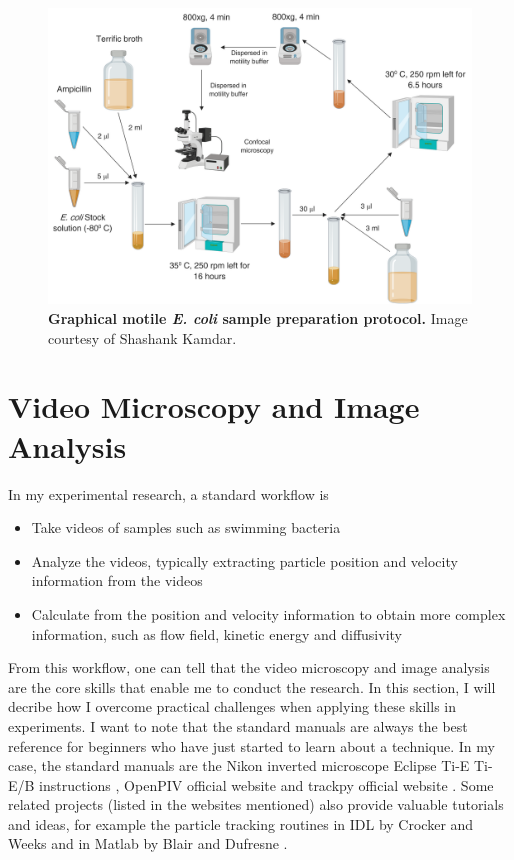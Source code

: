 \begin{figure}[!]
	\begin{center}
	\includegraphics[width=5.5 in]{Figs/2-Exp/2.pdf}
	\end{center}
	\caption[Figure 2.2:]
	{
	\textbf{Graphical motile \textit{E. coli} sample preparation protocol.}
	Image courtesy of Shashank Kamdar.
	}
	\label{fig:2-2}
\end{figure}





\section{Video Microscopy and Image Analysis}
\label{video-microscopy-and-image-analysis}
In my experimental research, a standard workflow is
\begin{itemize}
	\item Take videos of samples such as swimming bacteria
	\item Analyze the videos, typically extracting particle position and velocity information from the videos
	\item Calculate from the position and velocity information to obtain more complex information, such as flow field, kinetic energy and diffusivity
\end{itemize}
From this workflow, one can tell that the video microscopy and image analysis are the core skills that enable me to conduct the research.
In this section, I will decribe how I overcome practical challenges when applying these skills in experiments. I want to note that the standard manuals are always the best reference for beginners who have just started to learn about a technique.
In my case, the standard manuals are the Nikon inverted microscope Eclipse Ti-E Ti-E/B instructions \cite{NikonTiEManual}, OpenPIV official website \cite{OpenPIV-website, OpenPIV-paper} and trackpy official website \cite{trackpy-website}.
Some related projects (listed in the websites mentioned) also provide valuable tutorials and ideas, for example the particle tracking routines in IDL by Crocker and Weeks \cite{IDL-tracking} and in Matlab by Blair and Dufresne
\cite{Matlab-tracking}.


